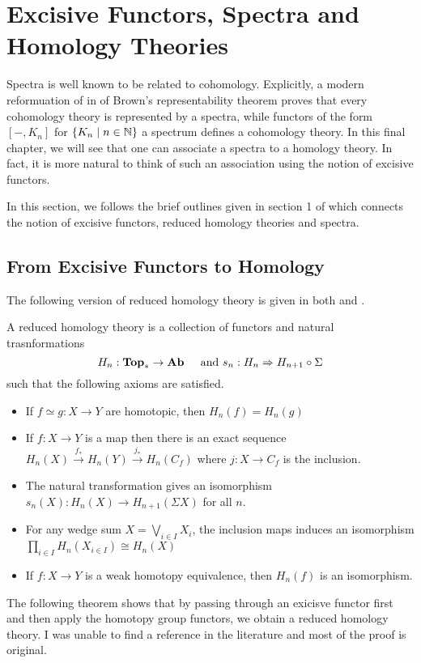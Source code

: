 \section{Excisive Functors, Spectra and Homology Theories}
Spectra is well known to be related to cohomology. Explicitly, a modern reformuation of in \cite{FSHT} of Brown's representability theorem proves that every cohomology theory is represented by a spectra, while functors of the form $[-,K_n]$ for $\{K_n\;|\;n\in\mathbb{N}\}$ a spectrum defines a cohomology theory. In this final chapter, we will see that one can associate a spectra to a homology theory. In fact, it is more natural to think of such an association using the notion of excisive functors. 

In this section, we follows the brief outlines given in section 1 of \cite{GW1} which connects the notion of excisive functors, reduced homology theories and spectra. 

\subsection{From Excisive Functors to Homology}
The following version of reduced homology theory is given in both \cite{LNAT} and \cite{ATHH}. 

\begin{defn}\label{defn:RedHomology} A reduced homology theory is a collection of functors and natural trasnformations $$H_n:\bold{Top}_\ast\to\bold{Ab}\;\;\;\;\text{ and }s_n:H_n\Rightarrow H_{n+1}\circ\Sigma$$ such that the following axioms are satisfied. 
\begin{itemize}
\item If $f\simeq g:X\to Y$ are homotopic, then $H_n(f)=H_n(g)$
\item If $f:X\to Y$ is a map then there is an exact sequence $H_n(X)\overset{f_\ast}{\rightarrow}H_n(Y)\overset{j_\ast}{\rightarrow}H_n(C_f)$ where $j:X\to C_f$ is the inclusion. 
\item The natural transformation gives an isomorphism $s_n(X):H_n(X)\to H_{n+1}(\Sigma X)$ for all $n$. 
\item For any wedge sum $X=\bigvee_{i\in I}X_i$, the inclusion maps induces an isomorphism $\prod_{i\in I} H_n(X_{i\in I})\cong H_n(X)$
\item If $f:X\to Y$ is a weak homotopy equivalence, then $H_n(f)$ is an isomorphism. 
\end{itemize}
\end{defn}

The following theorem shows that by passing through an exicisve functor first and then apply the homotopy group functors, we obtain a reduced homology theory. I was unable to find a reference in the literature and most of the proof is original. 

